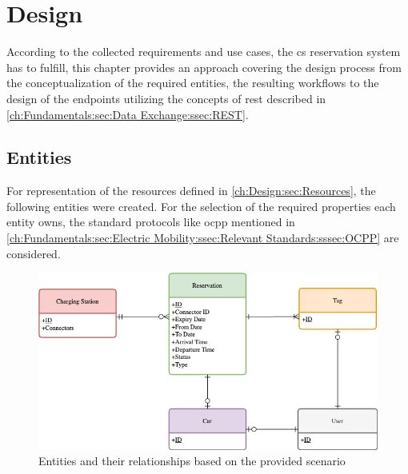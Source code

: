 
\chapter{Design}
\label{ch:Design}

According to the collected requirements and use cases, the \acrshort{cs} reservation system has to fulfill, this chapter provides an approach covering the design process from the conceptualization of the required entities, the resulting workflows to the design of the endpoints utilizing the concepts of \acrshort{rest} described in \ref{ch:Fundamentals:sec:Data Exchange:ssec:REST}. 

\section{Entities}
\label{ch:Design:sec:Entities}

For representation of the resources defined in \ref{ch:Design:sec:Resources}, the following entities were created. 
For the selection of the required properties each entity owns, the standard protocols like \acrshort{ocpp} mentioned in \ref{ch:Fundamentals:sec:Electric Mobility:ssec:Relevant Standards:sssec:OCPP} are considered. 

\begin{figure}[!ht]
    \centering
    \includegraphics[scale=0.4]{resources/images/main/5_design/Entities.png}
    \caption{Entities and their relationships based on the provided scenario}
    \label{fig:entity-relationship-diagram}
\end{figure}

